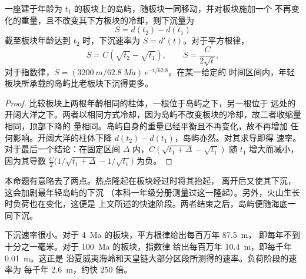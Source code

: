 \begin{proposition}[岛屿的热沉降]\label{prop:b2:oceanic-islands:sinking}
一座建于年龄为 $t_1$ 的板块上的岛屿，随板块一同移动，并对板块施加一个
不再变化的重量，且不改变其下方板块的冷却，则下沉量为
\[
S = d(t_2) - d(t_1)
\]
截至板块年龄达到 $t_2$ 时，下沉速率为 $\dot S = d'(t)$。对于平方根律，
\[
S = C\left(\sqrt{t_2} - \sqrt{t_1}\right), \qquad \dot S = \frac{C}{2\sqrt t},
\]
对于指数律，$\dot S = (\qty{3200}{m}/\qty{62.8}{Ma})\,e^{-t/62.8}$。在某一给定的
时间区间内，年轻板块所承载的岛屿比老板块下沉得更多。
\end{proposition}

\begin{proof}
比较板块上两根年龄相同的柱体，一根位于岛屿之下，另一根位于
远处的开阔大洋之下。两者以相同方式冷却，因为岛屿不改变板块的冷却，故二者收缩量相同，顶部下降的
量相同。岛屿自身的重量已经平衡且不再变化，故不再增加
任何影响。开阔大洋的柱体下降 $d(t_2) - d(t_1)$，岛屿亦然。对其求导即得
速率。对于最后一个结论：在固定区间 $\Delta$ 内，$C(\sqrt{t_1 + \Delta} -
\sqrt{t_1})$ 随 $t_1$ 增大而减小，因为其导数 $\frac C2\bigl(1/\sqrt{t_1 + \Delta}
- 1/\sqrt{t_1}\bigr)$ 为负。
\end{proof}

本命题有意略去了两点。热点隆起在板块经过时将其抬起，
离开后又使其下沉，这会加剧最年轻岛屿的下沉
（本科一年级分册测量过这一隆起）。另外，火山生长时负荷也在变化，这便是
上文所述的快速阶段。两者结束之后，岛屿便随海底一同下沉。

下沉速率很小。对于 \qty{4}{Ma} 的板块，平方根律给出每百万年 \qty{87.5}{m}，
即每年不到十分之一毫米。对于 \qty{100}{Ma} 的板块，指数律
给出每百万年 \qty{10.4}{m}，即每千年 \qty{0.01}{m}。这正是
沿夏威夷海岭和天皇链大部分区段所测得的速率。负荷阶段的速率为
每千年 \qty{2.6}{m}，约快 250 倍。

